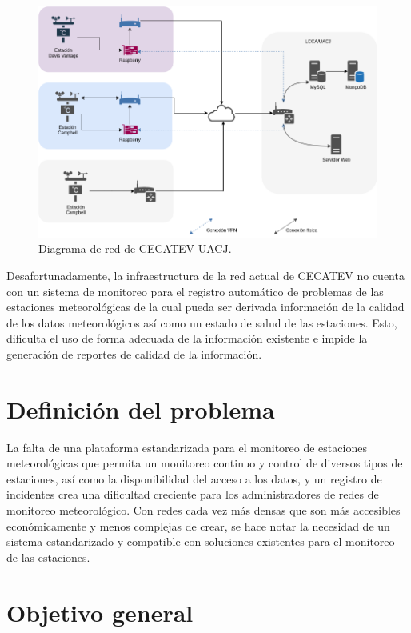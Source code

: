 

\begin{figure}[!ht]
	\centering
	\includegraphics[width=.80\linewidth]{images/diagrams/red_lcca.drawio.png}
	\caption{Diagrama de red de CECATEV UACJ.}
	\label{fig:current_network}
\end{figure}

Desafortunadamente, la infraestructura de la red actual de CECATEV no cuenta con un sistema de monitoreo para el registro automático de problemas de las estaciones meteorológicas de la cual pueda ser derivada información de la calidad de los datos meteorológicos así como un estado de salud de las estaciones. Esto, dificulta el uso de forma adecuada de la información existente e impide la generación de reportes de calidad de la información.

\section{Definición del problema}

La falta de una plataforma estandarizada para el monitoreo de estaciones meteorológicas que permita un monitoreo continuo y control de diversos tipos de estaciones, así como la disponibilidad del acceso a los datos, y un registro de incidentes crea una dificultad creciente para los administradores de redes de monitoreo meteorológico. Con redes cada vez más densas que son más accesibles económicamente y menos complejas de crear, se hace notar la necesidad de un sistema estandarizado y compatible con soluciones existentes para el monitoreo de las estaciones.

\section{Objetivo general}

